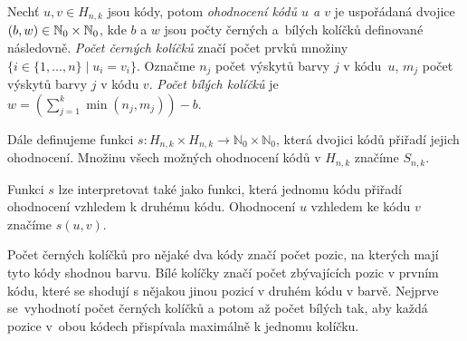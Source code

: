 \begin{definice}[Ohodnocení]\label{ohodnoceni}
  Nechť $u,v \in H_{n,k}$ jsou kódy, potom \emph{ohodnocení kódů $u$ a $v$} je uspořádaná dvojice $(b,w) \in \mathbb{N}_0 \times \mathbb{N}_0$, kde $b$ a $w$ jsou počty černých a~bílých kolíčků definované následovně. \emph{Počet černých kolíčků} značí počet prvků množiny $\{i\in\{1,\dots, n\}\mid  u_i = v_i \}$. Označme $n_j$ počet výskytů barvy $j$ v kódu~$u$, $m_j$ počet výskytů barvy $j$ v kódu $v$. \emph{Počet bílých kolíčků} je $w = \left( \sum_{j = 1}^k \min(n_j, m_j) \right) -b$.

  Dále definujeme funkci $s \colon H_{n,k} \times H_{n,k} \to \mathbb{N}_0\times \mathbb{N}_0$, která dvojici kódů přiřadí jejich ohodnocení. Množinu všech možných ohodnocení kódů v $H_{n,k}$ značíme $S_{n,k}$.
\end{definice}
\begin{pozn}
    Funkci $s$ lze interpretovat také jako funkci, která jednomu kódu přiřadí ohodnocení vzhledem k druhému kódu. Ohodnocení $u$ vzhledem ke kódu $v$ značíme $s(u,v)$. 
\end{pozn}

Počet černých kolíčků pro nějaké dva kódy značí počet pozic, na kterých mají tyto kódy shodnou barvu. Bílé kolíčky značí počet zbývajících pozic v prvním kódu, které se shodují s nějakou jinou pozicí v druhém kódu v barvě. Nejprve se~vyhodnotí počet černých kolíčků a potom až počet bílých tak, aby každá pozice v~obou kódech přispívala maximálně k jednomu kolíčku. 




